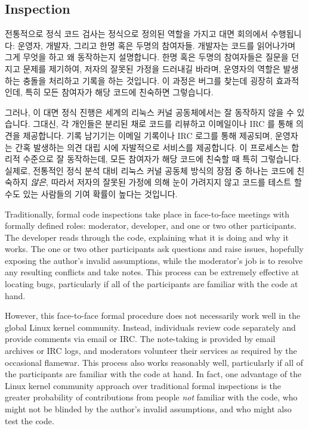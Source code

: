 \subsection{Inspection}
\label{sec:debugging:Inspection}

전통적으로 정식 코드 검사는 정식으로 정의된 역할을 가지고 대면 회의에서
수행됩니다: 운영자, 개발자, 그리고 한명 혹은 두명의 참여자들.
개발자는 코드를 읽어나가며 그게 무엇을 하고 왜 동작하는지 설명합니다.
한명 혹은 두명의 참여자들은 질문을 던지고 문제를 제기하여, 저자의 잘못된 가정을
드러내길 바라며, 운영자의 역할은 발생하는 충돌을 처리하고 기록을 하는 것입니다.
이 과정은 버그를 찾는데 굉장히 효과적인데, 특히 모든 참여자가 해당 코드에
친숙하면 그렇습니다.

그러나, 이 대면 정식 진행은 세계의 리눅스 커널 공동체에서는 잘 동작하지 않을 수
있습니다.
그대신, 각 개인들은 분리된 채로 코드를 리뷰하고 이메일이나 IRC 를 통해 의견을
제공합니다.
기록 남기기는 이메일 기록이나 IRC 로그를 통해 제공되며, 운영자는 간혹 발생하는
의견 대립 시에 자발적으로 서비스를 제공합니다.
이 프로세스는 합리적 수준으로 잘 동작하는데, 모든 참여자가 해당 코드에 친숙할
때 특히 그렇습니다.
실제로, 전통적인 정식 분석 대비 리눅스 커널 공동체 방식의 장점 중 하나는 코드에
친숙하지 \emph{않은}, 따라서 저자의 잘못된 가정에 의해 눈이 가려지지 않고
코드를 테스트 할수도 있는 사람들의 기여 확률이 높다는 것입니다.

\iffalse

Traditionally, formal code inspections take place in face-to-face meetings
with formally defined roles: moderator, developer, and one or two other
participants.
The developer reads through the code, explaining what it is doing and
why it works.
The one or two other participants ask questions and raise issues,
hopefully exposing the author's invalid assumptions, while the moderator's
job is to resolve any resulting conflicts and take notes.
This process can be extremely effective at locating bugs, particularly
if all of the participants are familiar with the code at hand.

However, this face-to-face formal procedure does not necessarily
work well in the global Linux kernel community.
Instead, individuals review code separately and provide comments via
email or IRC\@.
The note-taking is provided by email archives or IRC logs, and moderators
volunteer their services as required by the occasional flamewar.
This process also works reasonably well, particularly if all of the
participants are familiar with the code at hand.
In fact, one advantage of the Linux kernel community approach over
traditional formal inspections is the greater probability of contributions
from people \emph{not} familiar with the code, who might not be blinded
by the author's invalid assumptions, and who might also test the code.

